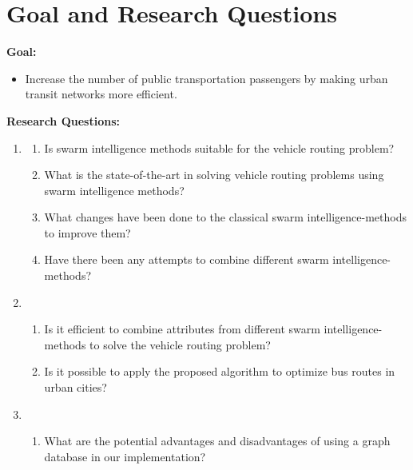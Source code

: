 \section{Goal and Research Questions}
\textbf{Goal:}
\begin{itemize}
\item \label{itm:goal} Increase the number of public transportation passengers by making urban transit networks more efficient.
\end{itemize}
\textbf{Research Questions:}
\begin{enumerate}[label=\textbf{\arabic*})]
\item \label{itm:1}
    \begin{enumerate}
    \item \label{itm:1a} Is swarm intelligence methods suitable for the vehicle routing problem?
    \item \label{itm:1b} What is the state-of-the-art in solving vehicle routing problems using swarm intelligence methods?
    \item \label{itm:1c} What changes have been done to the classical swarm intelligence-methods to improve them?
    \item \label{itm:1d} Have there been any attempts to combine different swarm intelligence-methods?
	\end{enumerate}
\item
    \begin{enumerate}
    \item \label{itm:2a} Is it efficient to combine attributes from different swarm intelligence-methods to solve the vehicle routing problem?
    \item \label{itm:2b} Is it possible to apply the proposed algorithm to optimize bus routes in urban cities?
    \end{enumerate}

\item
	\begin{enumerate}
	\item \label{itm:3a} What are the potential advantages and disadvantages of using a graph database in our implementation?
    \end{enumerate}
\end{enumerate}